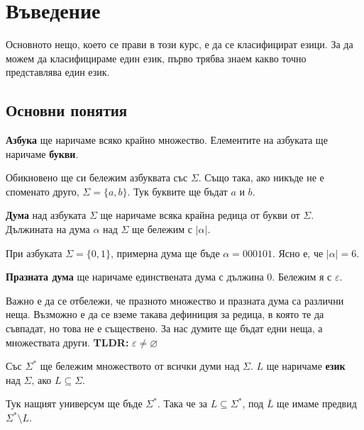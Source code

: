 \chapter{Въведение}

Основното нещо, което се прави в този курс, е да се класифицират езици.
За да можем да класифицираме един език, първо трябва знаем какво точно представлява един език.

\section{Основни понятия}

\begin{definition}
    \textbf{Азбука} ще наричаме всяко крайно множество.
    Елементите на азбуката ще наричаме \textbf{букви}.
\end{definition}

Обикновено ще си бележим азбуквата със $\Sigma$.
Също така, ако никъде не е споменато друго, $\Sigma = \{a, b \}$.
Тук буквите ще бъдат $a$ и $b$.

\begin{definition}
    \textbf{Дума} над азбуката $\Sigma$ ще наричаме всяка крайна редица от букви от $\Sigma$.
    Дължината на дума $\alpha$ над $\Sigma$ ще бележим с $|\alpha|$.
\end{definition}

При азбуката $\Sigma = \{0, 1\}$, примерна дума ще бъде $\alpha = 000101$.
Ясно е, че $|\alpha| = 6$.

\begin{definition}
    \textbf{Празната дума} ще наричаме единствената дума с дължина 0.
    Бележим я с $\varepsilon$.
\end{definition}

\begin{warning}
    Важно е да се отбележи, че празното множество и празната дума са различни неща.
    Възможно е да се вземе такава дефиниция за редица, в която те да съвпадат, но това не е съществено.
    За нас думите ще бъдат едни неща, а множествата други.
    \textbf{TLDR:} $\varepsilon \neq \varnothing$
\end{warning}

\begin{definition}
    Със $\Sigma^*$ ще бележим множеството от всички думи над $\Sigma$.
    $L$ ще наричаме \textbf{език} над $\Sigma$, ако $L \subseteq \Sigma$.
\end{definition}

Тук нащият универсум ще бъде $\Sigma^*$.
Така че за $L \subseteq \Sigma^*$, под $\overline{L}$ ще имаме предвид $\Sigma^* \setminus L$.

